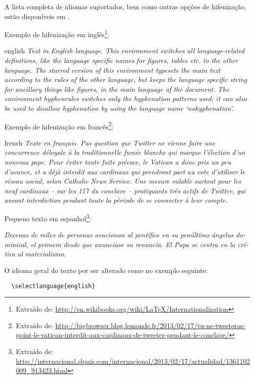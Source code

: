 \documentclass[12pt,oneside,a4paper,chapter=TITLE,
			   english,brazil]{abntex2}
\begin{document}
\begin{anexosenv}
A lista completa de idiomas suportados, bem como outras opções de hifenização, estão disponíveis em .

Exemplo de hifenização em inglês\footnote{Extraído de: \url{http://en.wikibooks.org/wiki/LaTeX/Internationalization}}:

\begin{otherlanguage*}{english}
\textit{Text in English language. This environment switches all language-related definitions, like the language specific names for figures, tables etc. to the other language. The starred version of this environment typesets the main text according to the rules of the other language, but keeps the language specific string for ancillary things like figures, in the main language of the document. The environment hyphenrules switches only the hyphenation patterns used; it can also be used to disallow hyphenation by using the language name `nohyphenation'.}
\end{otherlanguage*}

Exemplo de hifenização em francês\footnote{Extraído de: \url{http://bigbrowser.blog.lemonde.fr/2013/02/17/tu-ne-tweeteras-point-le-vatican-interdit-aux-cardinaux-de-tweeter-pendant-le-conclave/}}:

\begin{otherlanguage*}{french}
\textit{Texte en français. Pas question que Twitter ne vienne faire une concurrence déloyale à la traditionnelle fumée blanche qui marque l'élection d'un nouveau pape. Pour éviter toute fuite précoce, le Vatican a donc pris un peu d'avance, et a déjà interdit aux cardinaux qui prendront part au vote d'utiliser le réseau social, selon Catholic News Service. Une mesure valable surtout pour les neuf cardinaux – sur les 117 du conclave – pratiquants très actifs de Twitter, qui auront interdiction pendant toute la période de se connecter à leur compte.}
\end{otherlanguage*}

Pequeno texto em espanhol\footnote{Extraído de: \url{http://internacional.elpais.com/internacional/2013/02/17/actualidad/1361102009_913423.html}}:

\foreignlanguage{spanish}{\textit{Decenas de miles de personas ovacionan al pontífice en su penúltimo ángelus dominical, el primero desde que anunciase su renuncia. El Papa se centra en la crítica al materialismo}}.

O idioma geral do texto por ser alterado como no exemplo seguinte:
\begin{verbatim}
  \selectlanguage{english}
\end{verbatim}


\end{anexosenv}
\end{document}
